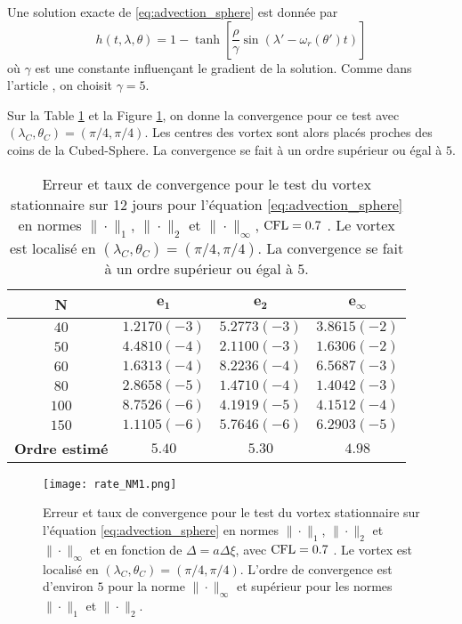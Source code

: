 Une solution exacte de \eqref{eq:advection_sphere} est donnée par
\begin{equation}
h(t, \lambda, \theta) = 1 - \tanh \left[ \dfrac{\rho}{\gamma} \sin (\lambda' - \omega_r (\theta') t) \right]
\label{eq:NM_solexacte}
\end{equation}
où $\gamma$ est une constante influençant le gradient de la solution. Comme dans l'article \cite{Nair2002}, on choisit $\gamma = 5$.

Sur la Table \ref{tab:rate1_NM} et la Figure \ref{fig:rate1_NM}, on donne la convergence pour ce test avec $(\lambda_C, \theta_C)=(\pi /4 , \pi /4)$. Les centres des vortex sont alors placés proches des coins de la Cubed-Sphere. La convergence se fait à un ordre supérieur ou égal à $5$.

\begin{table}[htbp]
\begin{center}
\begin{tabular}{|c||c|c|c|}
\hline
\textbf{N}  & $\mathbf{e_1}$ & $\mathbf{e_2}$ & $\mathbf{e_{\infty}}$\\
\hline
\hline
$40$  & $1.2170 (-3)$ & $5.2773 (-3)$ & $3.8615 (-2)$ \\
$50$  & $4.4810 (-4)$ & $2.1100 (-3)$ & $1.6306 (-2)$ \\
$60$  & $1.6313 (-4)$ & $8.2236 (-4)$ & $6.5687 (-3)$ \\
$80$  & $2.8658 (-5)$ & $1.4710 (-4)$ & $1.4042 (-3)$ \\
$100$  & $8.7526 (-6)$ & $4.1919 (-5)$ & $4.1512 (-4)$ \\
$150$  & $1.1105 (-6)$ & $5.7646 (-6)$ & $6.2903 (-5)$ \\
\hline 
\hline
\textbf{Ordre estimé}& $5.40$ & $5.30$ & $4.98$\\
\hline
\end{tabular}
\end{center}
\caption{Erreur et taux de convergence pour le test du vortex stationnaire sur 12 jours pour l'équation \eqref{eq:advection_sphere} en normes $\| \cdot\|_1$, $\| \cdot\|_2$ et $\| \cdot\|_{\infty}$, $\text{CFL} = 0.7$ \cite{Nair2002}. Le vortex est localisé en $(\lambda_C, \theta_C)=(\pi /4 , \pi /4)$. La convergence se fait à un ordre supérieur ou égal à $5$.}
\label{tab:rate1_NM}
\end{table} 

\begin{figure}[htbp]
\begin{center}
\texttt{[image: rate\_NM1.png]}
\end{center}
\caption{Erreur et taux de convergence pour le test du vortex stationnaire sur l'équation \eqref{eq:advection_sphere} en normes $\| \cdot\|_1$, $\| \cdot\|_2$ et $\| \cdot\|_{\infty}$ et en fonction de $\Delta = a \Delta \xi$, avec $\text{CFL} = 0.7$ \cite{Nair2002}. Le vortex est localisé en $(\lambda_C, \theta_C)=(\pi /4 , \pi /4)$. L'ordre de convergence est d'environ $5$ pour la norme $\| \cdot \|_{\infty}$ et supérieur pour les normes $\| \cdot \|_{1}$ et $\| \cdot \|_{2}$.}
\label{fig:rate1_NM}
\end{figure} 

